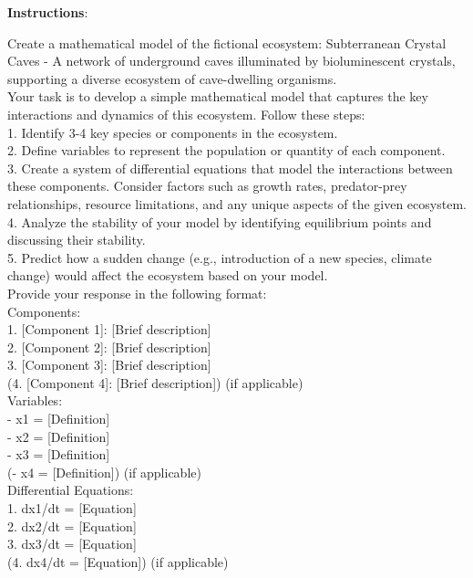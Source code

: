 \begin{tcolorbox}[breakable,boxrule=0.5pt,sharp corners,fontupper=\small,
colback=green!10, colframe=green!50!black, title={Success: Mathematical Model of Subterranean Crystal Caves}]
\textbf{Instructions}: 

Create a mathematical model of the fictional ecosystem: Subterranean Crystal Caves - A network of underground caves illuminated by bioluminescent crystals, supporting a diverse ecosystem of cave-dwelling organisms.\\

Your task is to develop a simple mathematical model that captures the key interactions and dynamics of this ecosystem. Follow these steps:\\

1. Identify 3-4 key species or components in the ecosystem.\\
2. Define variables to represent the population or quantity of each component.\\
3. Create a system of differential equations that model the interactions between these components. Consider factors such as growth rates, predator-prey relationships, resource limitations, and any unique aspects of the given ecosystem.\\
4. Analyze the stability of your model by identifying equilibrium points and discussing their stability.\\
5. Predict how a sudden change (e.g., introduction of a new species, climate change) would affect the ecosystem based on your model.\\

Provide your response in the following format:\\

Components:\\
1. [Component 1]: [Brief description]\\
2. [Component 2]: [Brief description]\\
3. [Component 3]: [Brief description]\\
(4. [Component 4]: [Brief description]) (if applicable)\\

Variables:\\
- x1 = [Definition]\\
- x2 = [Definition]\\
- x3 = [Definition]\\
(- x4 = [Definition]) (if applicable)\\

Differential Equations:\\
1. dx1/dt = [Equation]\\
2. dx2/dt = [Equation]\\
3. dx3/dt = [Equation]\\
(4. dx4/dt = [Equation]) (if applicable)\\


\end{tcolorbox}

